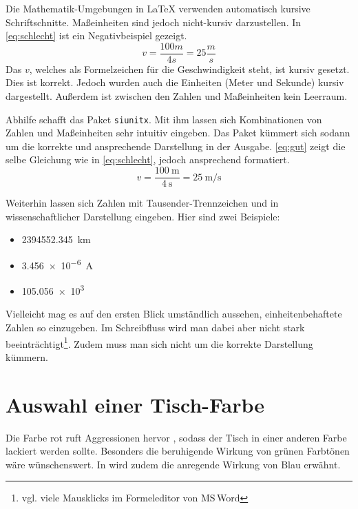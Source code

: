 \documentclass{scrbook}
\begin{document}
Die Mathematik-Umgebungen in \LaTeX{} verwenden automatisch kursive Schriftschnitte. Maßeinheiten sind jedoch nicht-kursiv darzustellen. In \autoref{eq:schlecht} ist ein Negativbeispiel gezeigt.
\begin{equation}
v = \dfrac{100 m}{4 s} = 25 \dfrac{m}{s} \label{eq:schlecht}	
\end{equation}
Das $v$, welches als Formelzeichen für die Geschwindigkeit steht, ist kursiv gesetzt. Dies ist korrekt. Jedoch wurden auch die Einheiten (Meter und Sekunde) kursiv dargestellt. Außerdem ist zwischen den Zahlen und Maßeinheiten kein Leerraum.

Abhilfe schafft das Paket \texttt{siunitx}. Mit ihm lassen sich Kombinationen von Zahlen und Maßeinheiten sehr intuitiv eingeben. Das Paket kümmert sich sodann um die korrekte und ansprechende Darstellung in der Ausgabe. \autoref{eq:gut} zeigt die selbe Gleichung wie in \autoref{eq:schlecht}, jedoch ansprechend formatiert.
\begin{equation}
	v = \dfrac{\SI{100}{\metre}}{\SI{4}{\second}} = \SI{25}{\metre\per\second} \label{eq:gut}
\end{equation}

Weiterhin lassen sich Zahlen mit Tausender-Trennzeichen und in wissenschaftlicher Darstellung eingeben. Hier sind zwei Beispiele:
\begin{itemize}
	\item \SI{2394552,345}{\kilo\metre}
	\item \SI{3,456e-6}{\ampere}
	\item \num{105,056 e3}
\end{itemize}

Vielleicht mag es auf den ersten Blick umständlich aussehen, einheitenbehaftete Zahlen so einzugeben. Im Schreibfluss wird man dabei aber nicht stark beeinträchtigt\footnote{vgl. viele Mausklicks im Formeleditor von MS\,Word}. Zudem muss man sich nicht um die korrekte Darstellung kümmern.

\chapter{Auswahl einer Tisch-Farbe}
Die Farbe rot ruft Aggressionen hervor \cite{Meier.2012}, sodass der Tisch in einer anderen Farbe lackiert werden sollte. Besonders die beruhigende Wirkung von grünen Farbtönen \cite[S.\,56]{Helmbrecht.2001} wäre wünschenswert. In \cite{Meier.2012} wird zudem die anregende Wirkung von Blau erwähnt.



\end{document}
